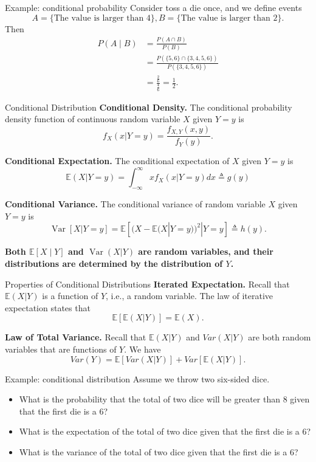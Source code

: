 \documentclass[10pt]{beamer}
\newcommand{\expect}{\mathbb{E}}
\newcommand{\var}{\operatorname{Var}}
\begin{document}
\begin{frame}{Example: conditional probability}
    Consider toss a die once, and we define events 
    \[
        A = \{\text{The value is larger than 4}\}, B = \{\text{The value is larger than 2}\}.
    \]
    Then 
    \begin{align*}
        P(A \mid B) 
            &= \frac{P(A \cap B)}{P(B)} \\
            &= \frac{P(\{5, 6\} \cap \{3, 4, 5, 6\})}{P(\{3,4, 5, 6\})} \\
            &= \frac{\frac{2}{6}}{\frac{4}{6}} = \frac{1}{2}.
    \end{align*}
\end{frame}

\begin{frame}{Conditional Distribution}
\textbf{Conditional Density.} The conditional probability density function of continuous random variable $X$ given $Y=y$ is 
\[f_X(x|Y=y) = \frac{f_{X,Y}(x,y)}{f_Y(y)}.\]

  \textbf{Conditional Expectation.} The conditional expectation of $X$ given $Y = y$ is 
  \[
    \mathbb{E}(X|Y=y) = \int_{-\infty}^{\infty} x f_X(x|Y=y)dx \triangleq g(y)
  \]

\textbf{Conditional Variance.} The conditional variance of random variable $X$ given $Y = y$ is 
\[
\var[X|Y=y] = \mathbb{E}[(X-\mathbb{E}(X|Y=y))^2|Y=y]\triangleq h(y).
\] 

\textbf{Both $\expect[X \mid Y]$ and $\var(X|Y)$ are random variables, and their distributions are determined by the distribution of $Y$.}
\end{frame}

\begin{frame}{Properties of Conditional Distributions}
   \textbf{Iterated Expectation.}
Recall that $\mathbb{E}(X|Y)$ is a function of $Y$, i.e., a random variable. The law of iterative expectation states that
$$\mathbb{E}[\mathbb{E}(X|Y)] = \mathbb{E}(X).$$

\textbf{Law of Total Variance.}
Recall that $\mathbb{E}(X|Y)$ and $Var(X|Y)$ are both random variables that are functions of $Y$. We have
$$Var(Y) = \mathbb{E}[Var(X|Y)] + Var[\mathbb{E}(X|Y)].$$ 
\end{frame}

\begin{frame}{Example: conditional distribution}
Assume we throw two six-sided dice.

\begin{itemize}
    \item What is the probability that the total of two dice will be greater than $8$ given that the first die is a $6$? 
    \item What is the expectation of the total of two dice given that the first die is a $6$? 
    \item What is the variance of the total of two dice given that the first die is a $6$? 
\end{itemize}
\end{frame}
\end{document}
